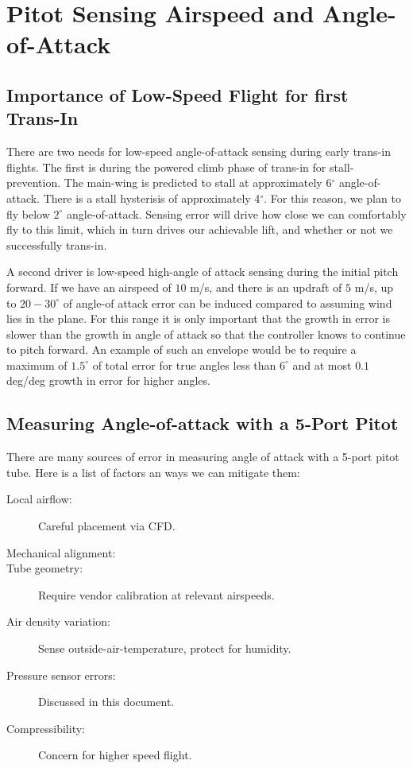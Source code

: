 \documentclass{article}
\begin{document}
\section{Pitot Sensing Airspeed and Angle-of-Attack}

\subsection{Importance of Low-Speed Flight for first Trans-In}
There are two needs for low-speed angle-of-attack sensing during early
trans-in flights.  The first is during the powered climb phase of
trans-in for stall-prevention.  The main-wing is predicted to stall at
approximately 6$^\circ$ angle-of-attack.  There is a stall hysterisis
of approximately 4$^\circ$.  For this reason, we plan to fly below
$2^\circ$ angle-of-attack.  Sensing error will drive how close we can
comfortably fly to this limit, which in turn drives our achievable
lift, and whether or not we successfully trans-in.

A second driver is low-speed high-angle of attack sensing during the
initial pitch forward.  If we have an airspeed of $10$ m/s, and there
is an updraft of $5$ m/s, up to $20-30^\circ$ of angle-of attack error
can be induced compared to assuming wind lies in the plane.  For this
range it is only important that the growth in error is slower than the
growth in angle of attack so that the controller knows to continue to
pitch forward.  An example of such an envelope would be to require a
maximum of $1.5^\circ$ of total error for true angles less than
$6^\circ$ and at most $0.1$ deg/deg growth in error for higher angles.

\subsection{Measuring Angle-of-attack with a 5-Port Pitot}
There are many sources of error in measuring angle of attack with a
5-port pitot tube.  Here is a list of factors an ways we can mitigate them:

\begin{description}
\item[Local airflow:] Careful placement via CFD.
\item[Mechanical alignment:]
\item[Tube geometry:] Require vendor calibration at relevant airspeeds.
\item[Air density variation:] Sense outside-air-temperature, protect for humidity.
\item[Pressure sensor errors:] Discussed in this document.
\item[Compressibility:] Concern for higher speed flight.
\end{description}
\end{document}
